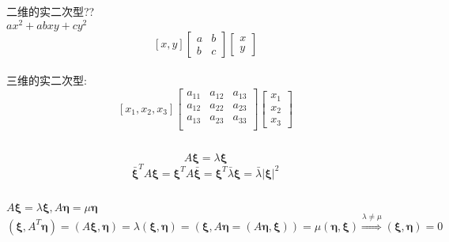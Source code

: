 \documentclass[11pt, a4paper, UTF8]{ctexart}
\begin{document}
\section{}
\subsection{}
二维的实二次型??\\
$ax^2+abxy+cy^2$\\
\[[x,y]\begin{bmatrix}
a&b\\
b&c
\end{bmatrix}\begin{bmatrix}
x\\
y
\end{bmatrix}\]\\
三维的实二次型:\\
\[[x_1,x_2,x_3]\begin{bmatrix}
a_{11}&a_{12}&a_{13}\\
a_{12}&a_{22}&a_{23}\\
a_{13}&a_{23}&a_{33}\\
\end{bmatrix}\begin{bmatrix}
x_1\\
x_2\\
x_3
\end{bmatrix}\]
\subsection{}
\[A\bm\xi=\lambda\bm\xi\]
\[\bar{\bm\xi}^TA\bm\xi=\bm\xi^TA\bar{\bm\xi}=\bm\xi^T\bar{\lambda}\bm\xi=\bar\lambda|\bm\xi|^2\]
\subsection{}
$A\bm\xi=\lambda\bm\xi,A\bm\eta=\mu\bm\eta$\\
$(\bm\xi,A^T\bm\eta)=(A\bm\xi,\bm\eta)=\lambda(\bm\xi,\bm\eta)=(\bm\xi,A\bm\eta=(A\bm\eta,\bm\xi))=\mu(\bm\eta,\bm\xi)\overset{\lambda\not=\mu}{\Rightarrow}(\bm\xi,\bm\eta)=0$\\
\end{document}
